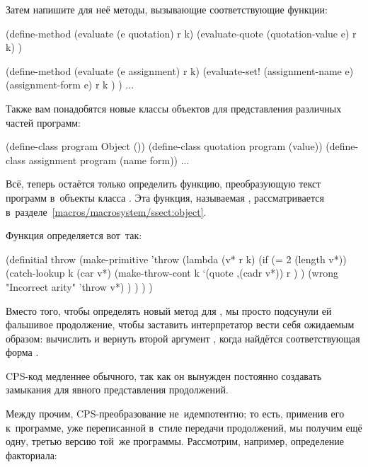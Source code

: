 \noindent
Затем напишите для неё методы, вызывающие соответствующие функции:

\begin{code:lisp}
(define-method (evaluate (e quotation) r k)
  (evaluate-quote (quotation-value e) r k) )

(define-method (evaluate (e assignment) r k)
  (evaluate-set! (assignment-name e)
                 (assignment-form e)
                 r k ) )
...
\end{code:lisp}
\noindent
Также вам понадобятся новые классы объектов для представления различных частей
программ:

\begin{code:lisp}
(define-class program    Object  ())
(define-class quotation  program (value))
(define-class assignment program (name form))
...
\end{code:lisp}

Всё, теперь остаётся только определить функцию, преобразующую текст программ
в~объекты класса . Эта функция, называемая ,
рассматривается в~разделе~\ref{macros/macrosystem/ssect:object}.



Функция  определяется вот~так:

\begin{code:lisp}
(definitial throw
  (make-primitive 'throw
   (lambda (v* r k)
     (if (= 2 (length v*))
         (catch-lookup k (car v*)
                       (make-throw-cont k
                        `(quote ,(cadr v*)) r ) )
         (wrong "Incorrect arity" 'throw v*) ) ) ) )
\end{code:lisp}

Вместо того, чтобы определять новый метод для , мы просто
подсунули ей фальшивое продолжение, чтобы заставить интерпретатор вести себя
ожидаемым образом: вычислить и вернуть второй аргумент , когда
найдётся соответствующая форма .



CPS-код медленнее обычного, так как он вынужден постоянно создавать замыкания
для явного представления продолжений.

Между прочим, CPS-преобразование не~идемпотентно; то есть, применив его
к~программе, уже переписанной в~стиле передачи продолжений, мы получим ещё одну,
третью версию той~же программы. Рассмотрим, например, определение факториала:

